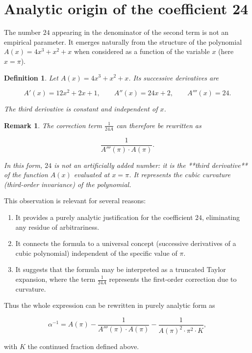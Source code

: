 \documentclass[12pt]{article}
\newtheorem{remark}{Remark}
\newtheorem{definition}{Definition}
\begin{document}
\section{Analytic origin of the coefficient 24}

The number $24$ appearing in the denominator of the second term is not an empirical parameter. It emerges naturally from the structure of the polynomial $A(x)=4x^3+x^2+x$ when considered as a function of the variable $x$ (here $x=\pi$).

\begin{definition}
Let $A(x)=4x^3+x^2+x$. Its successive derivatives are

\[
A'(x)=12x^2+2x+1,\qquad A''(x)=24x+2,\qquad A'''(x)=24.
\]

The third derivative is constant and independent of $x$.
\end{definition}

\begin{remark}
The correction term $\frac{1}{24A}$ can therefore be rewritten as

\[
\frac{1}{A'''(\pi)\cdot A(\pi)}.
\]

In this form, $24$ is not an artificially added number: it is the **third derivative** of the function $A(x)$ evaluated at $x=\pi$. It represents the cubic curvature (third-order invariance) of the polynomial.
\end{remark}

This observation is relevant for several reasons:
\begin{enumerate}
    \item It provides a purely analytic justification for the coefficient $24$, eliminating any residue of arbitrariness.
    \item It connects the formula to a universal concept (successive derivatives of a cubic polynomial) independent of the specific value of $\pi$.
    \item It suggests that the formula may be interpreted as a truncated Taylor expansion, where the term $\frac{1}{24A}$ represents the first-order correction due to curvature.
\end{enumerate}

Thus the whole expression can be rewritten in purely analytic form as

\[
\alpha^{-1} = A(\pi) - \frac{1}{A'''(\pi)\cdot A(\pi)} - \frac{1}{A(\pi)^2 \cdot \pi^2 \cdot K},
\]

with $K$ the continued fraction defined above.
\end{document}
